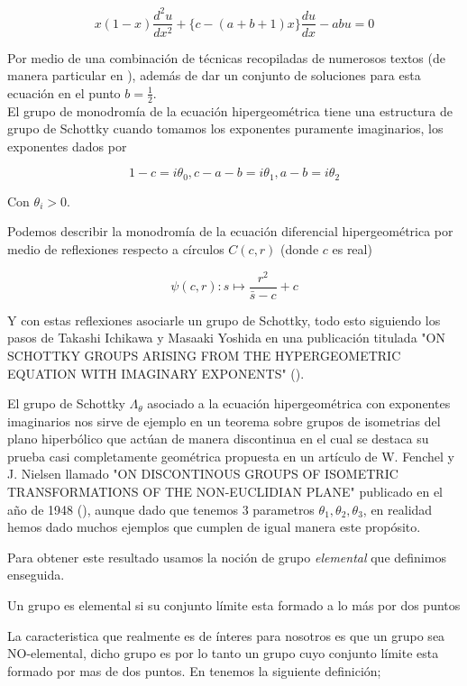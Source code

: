 \begin{resumen}
 $$x(1-x)\frac{d^{2}u}{dx^{2}} +  \lbrace c- (a+b+1 )x \rbrace \frac{du}{dx} - abu=0 $$

 Por medio de una combinaci\'on de t\'ecnicas recopiladas de numerosos textos (de manera particular en \cite{gausspainleve}), adem\'as de dar un conjunto de soluciones para esta ecuaci\'on en el punto $b=\frac{1}{2}$.\\



El grupo de monodrom\'ia de la ecuaci\'on hipergeom\'etrica tiene una estructura de grupo de Schottky cuando tomamos los exponentes puramente imaginarios, los exponentes dados por

$$1-c = i\theta_{0}, c-a-b = i\theta_{1},a-b=i\theta_{2} $$

Con $\theta_{i} > 0$.

Podemos describir la monodrom\'ia de la ecuaci\'on diferencial hipergeom\'etrica por medio de reflexiones respecto a c\'irculos $C(c,r)$ (donde $c$ es real)

$$\psi (c,r):s \mapsto \frac{r^{2}}{\bar{s} -c} +c$$

Y con estas reflexiones asociarle un grupo de Schottky, todo esto siguiendo los pasos de Takashi Ichikawa y Masaaki Yoshida  en una publicaci\'on titulada "ON SCHOTTKY GROUPS ARISING FROM THE HYPERGEOMETRIC EQUATION WITH IMAGINARY EXPONENTS" (\cite{Masaaki}).

El grupo de Schottky $\Lambda_{\theta}$ asociado a la ecuaci\'on hipergeom\'etrica con exponentes imaginarios nos sirve de ejemplo en un teorema sobre grupos de isometrias del plano hiperb\'olico que act\'uan de manera discontinua en el cual se destaca su prueba casi completamente geom\'etrica propuesta en un art\'iculo de W. Fenchel y J. Nielsen llamado "ON DISCONTINOUS GROUPS OF ISOMETRIC TRANSFORMATIONS OF THE NON-EUCLIDIAN PLANE" publicado en el año de 1948 (\cite{Nielsen}), aunque dado que tenemos 3 parametros $\theta_{1},\theta_{2},\theta_{3}$, en realidad hemos dado muchos ejemplos que cumplen de igual manera este prop\'osito.


Para obtener este resultado usamos la noci\'on de grupo \textit{elemental} que definimos enseguida.

\begin{defn}
\label{def:elemental}
Un grupo es elemental si su conjunto l\'imite esta formado a lo m\'as por dos puntos
\end{defn}

La caracteristica que realmente es de \'interes para nosotros es que un grupo sea NO-elemental, dicho grupo es por lo tanto un grupo cuyo conjunto l\'imite esta formado por  mas de dos puntos.
En \cite{Nielsen} tenemos la siguiente definici\'on;


\end{resumen}

